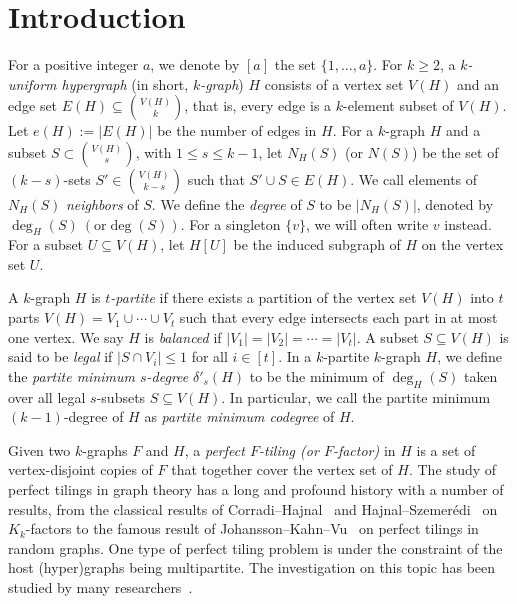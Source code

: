 \documentclass[11pt,a4paper]{article}
\theoremstyle{definition}
\begin{document}
\section{Introduction}

For a positive integer $a$, we denote by $[a]$ the set $\{1,\dots,a\}$. For $k\geq 2$, a \textit{$k$-uniform hypergraph} (in short, \textit{$k$-graph}) $H$ consists of a vertex set $V(H)$ and an edge set $E(H)\subseteq \binom{V(H)}{k}$, that is, every edge is a $k$-element subset of $V(H)$. Let $e(H):=|E(H)|$ be the number of edges in $H$.
For a $k$-graph $H$ and a subset $S\subset \binom{V(H)}{s}$, with $1 \leq s\leq k-1$, let $N_H(S)$ (or $N(S)$) be the set of $(k-s)$-sets $S'\in \binom{V(H)}{k-s}$ such that $S'\cup S\in E(H)$. We call elements of $N_H(S)$ {\emph{neighbors}} of $S$. We define the \emph{degree} of $S$ to be $|N_H(S)|$, denoted by $\deg_H(S)\ (\text{or} \deg(S))$. For a singleton $\{v\}$, we will often write $v$ instead. For a subset $U\subseteq V(H)$, let $H[U]$ be the induced subgraph of $H$ on the vertex set $U$.

A $k$-graph $H$ is \textit{$t$-partite} if there exists a partition of the vertex set $V(H)$ into $t$ parts $V(H)=V_1\cup \cdots \cup V_t$ such that every edge intersects each part in at most one vertex. We say $H$ is \emph{balanced} if $|V_1|=|V_2|=\cdots =|V_t|$. A subset $S\subseteq V(H)$ is said to be \textit{legal} if $|S\cap V_i|\leq 1$ for all $i\in [t]$. In a $k$-partite $k$-graph $H$, we define the \textit{partite minimum $s$-degree} $\delta'_s(H)$ to be the minimum of $\deg_H(S)$ taken over all legal $s$-subsets $S\subseteq V(H)$.
In particular, we call the partite minimum $(k-1)$-degree of $H$ as \textit{partite minimum codegree} of $H$. 

Given two $k$-graphs $F$ and $H$, a \textit{perfect $F$-tiling (or $F$-factor)} in $H$ is a set of vertex-disjoint copies of $F$ that together cover the vertex set of $H$. The study of perfect tilings in graph theory has a long and profound history with a number of results, from the classical results of Corradi--Hajnal~\cite{Corr} and Hajnal--Szemer\'edi~\cite{Hajn} on $K_k$-factors to the famous result of Johansson--Kahn--Vu~\cite{Johansson2008Factors} on perfect tilings in random graphs. One type of perfect tiling problem is under the constraint of the host (hyper)graphs being multipartite. The investigation on this topic has been studied by many researchers~\cite{FI, MarS,LoM,Oleg,AhG,Csa,Kee,KuhD,HanZ,LoK2}.
\end{document}
